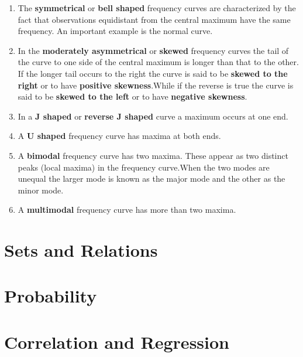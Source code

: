 \documentclass[]{book}
\providecommand{\tightlist}{%
  \setlength{\itemsep}{0pt}\setlength{\parskip}{0pt}}
\begin{document}
\begin{enumerate}
\def\labelenumi{\arabic{enumi}.}
\tightlist
\item
  The \textbf{symmetrical} or \textbf{bell shaped} frequency curves are characterized by the fact that observations equidistant from the central maximum have the same frequency. An important example is the normal curve.
\item
  In the \textbf{moderately asymmetrical} or \textbf{skewed} frequency curves the tail of the curve to one side of the central maximum is longer than that to the other. If the longer tail occurs to the right the curve is said to be \textbf{skewed to the right} or to have \textbf{positive skewness}.While if the reverse is true the curve is said to be \textbf{skewed to the left} or to have \textbf{negative skewness}.
\item
  In a \textbf{J shaped} or \textbf{reverse J shaped} curve a maximum occurs at one end.
\item
  A \textbf{U shaped} frequency curve has maxima at both ends.
\item
  A \textbf{bimodal} frequency curve has two maxima. These appear as two distinct peaks (local maxima) in the frequency curve.When the two modes are unequal the larger mode is known as the major mode and the other as the minor mode.
\item
  A \textbf{multimodal} frequency curve has more than two maxima.
\end{enumerate}

\hypertarget{sets-and-relations}{%
\chapter{Sets and Relations}\label{sets-and-relations}}

\hypertarget{probability}{%
\chapter{Probability}\label{probability}}

\hypertarget{correlation-and-regression}{%
\chapter{Correlation and Regression}\label{correlation-and-regression}}


\end{document}
